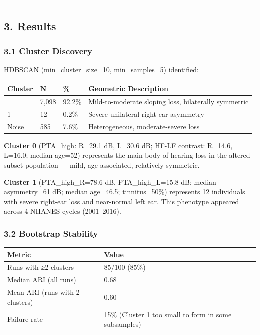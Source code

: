 \documentclass[
]{article}
\newcounter{none} %
\begin{document}
\begin{center}\rule{0.5\linewidth}{0.5pt}\end{center}

\subsection{3. Results}\label{results}

\subsubsection{3.1 Cluster Discovery}\label{cluster-discovery}

HDBSCAN (min\_cluster\_size=10, min\_samples=5) identified:

{\def\LTcaptype{none} %
\begin{longtable}[]{@{}llll@{}}
\toprule\noalign{}
Cluster & N & \% & Geometric Description \\
\midrule\noalign{}
\endhead
\bottomrule\noalign{}
\endlastfoot
0 & 7,098 & 92.2\% & Mild-to-moderate sloping loss, bilaterally symmetric \\
1 & 12 & 0.2\% & Severe unilateral right-ear asymmetry \\
Noise & 585 & 7.6\% & Heterogeneous, moderate-severe loss \\
\end{longtable}
}

\textbf{Cluster 0} (PTA\_high: R=29.1 dB, L=30.6 dB; HF-LF contrast: R=14.6,
L=16.0; median age=52) represents the main body of hearing loss in the
altered-subset population --- mild, age-associated, relatively symmetric.

\textbf{Cluster 1} (PTA\_high\_R=78.6 dB, PTA\_high\_L=15.8 dB; median
asymmetry=61 dB; median age=46.5; tinnitus=50\%) represents 12 individuals with
severe right-ear loss and near-normal left ear. This phenotype appeared across 4
NHANES cycles (2001--2016).

\subsubsection{3.2 Bootstrap Stability}\label{bootstrap-stability}

{\def\LTcaptype{none} %
\begin{longtable}[]{@{}ll@{}}
\toprule\noalign{}
Metric & Value \\
\midrule\noalign{}
\endhead
\bottomrule\noalign{}
\endlastfoot
Runs with ≥2 clusters & 85/100 (85\%) \\
Median ARI (all runs) & 0.68 \\
Mean ARI (runs with 2 clusters) & 0.60 \\
Failure rate & 15\% (Cluster 1 too small to form in some subsamples) \\
\end{longtable}
}
\end{document}
